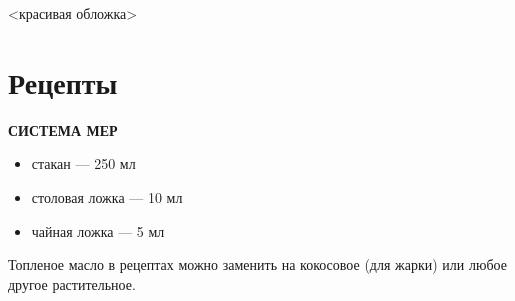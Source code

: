 \documentclass[
a4paper, %
12pt, %
onecolumn, %
openany, %
]{memoir}
\begin{document}
\pagestyle{empty}
\let\cleardoublepage\clearpage
\frontmatter
<красивая обложка>
\newpage
\setlength{\voffset}{1.5cm}
%
\setlength{\voffset}{0cm}

\titleJT
\cleardoublepage
\clearpage

\pagestyle{standard}


\tableofcontents\label{TOC}
\clearpage

\pagestyle{chap}


\mainmatter




\chapter{Рецепты}
\textbf{СИСТЕМА МЕР}
\begin{itemize}
\item стакан — 250 мл
\item столовая ложка — 10 мл
\item чайная ложка — 5 мл
\end{itemize}
\begin{advice}
\item Топленое масло в рецептах можно заменить на кокосовое (для жарки) или любое другое растительное.
\end{advice}







\backmatter


% 
% 
\end{document}
